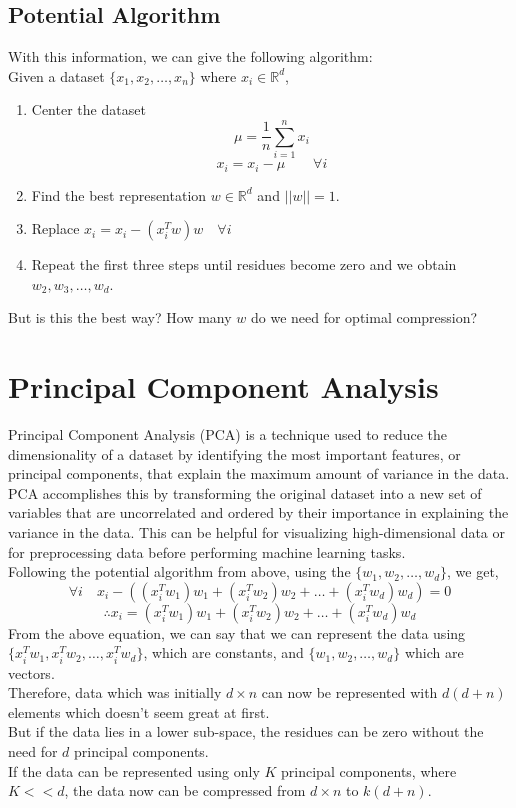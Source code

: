 \documentclass[letterpaper,11pt]{article}
\begin{document}
\subsection{Potential Algorithm}
With this information, we can give the following algorithm:\\
Given a dataset $\{x_1, x_2, \ldots, x_n\}$ where $x_i \in \mathbb{R}^{d}$,
\begin{enumerate}
    \item Center the dataset
    $$
    \mu = \frac{1}{n} \sum _{i=1} ^{n} x_i
    $$
    $$
    x_i = x_i - \mu  \hspace{2em} \forall i
    $$
    \item Find the best representation $w \in \mathbb{R}^d$ and $||w|| = 1$.
    \item Replace $x_i = x_i - (x_i^Tw)w  \hspace{1em} \forall i$
    \item Repeat the first three steps until residues become zero and we obtain $w_2, w_3, \ldots, w_d$.
\end{enumerate}
But is this the best way? How many $w$ do we need for optimal compression?

\section{Principal Component Analysis}
Principal Component Analysis (PCA) is a technique used to reduce the dimensionality of a dataset by identifying the most important features, or principal components, that explain the maximum amount of variance in the data. PCA accomplishes this by transforming the original dataset into a new set of variables that are uncorrelated and ordered by their importance in explaining the variance in the data. This can be helpful for visualizing high-dimensional data or for preprocessing data before performing machine learning tasks. \\
Following the potential algorithm from above, using the $\{w_1, w_2, \ldots, w_d\}$, we get,
$$
\forall i \hspace{1em} x_i - ((x_i^Tw_1)w_1 + (x_i^Tw_2)w_2 + \ldots +(x_i^Tw_d)w_d) = 0
$$
$$
\therefore x_i = (x_i^Tw_1)w_1 + (x_i^Tw_2)w_2 + \ldots +(x_i^Tw_d)w_d
$$
From the above equation, we can say that we can represent the data using $\{x_i^Tw_1, x_i^Tw_2, \ldots, x_i^Tw_d\}$, which are constants, and $\{w_1, w_2, \ldots, w_d\}$ which are vectors.\\
Therefore, data which was initially $d \times n$ can now be represented with $d (d + n)$ elements which doesn't seem great at first. \\
But if the data lies in a lower sub-space, the residues can be zero without the need for $d$ principal components. \\
If the data can be represented using only $K$ principal components, where $K << d$, the data now can be compressed from $d \times n$ to $k(d + n)$.
\end{document}
